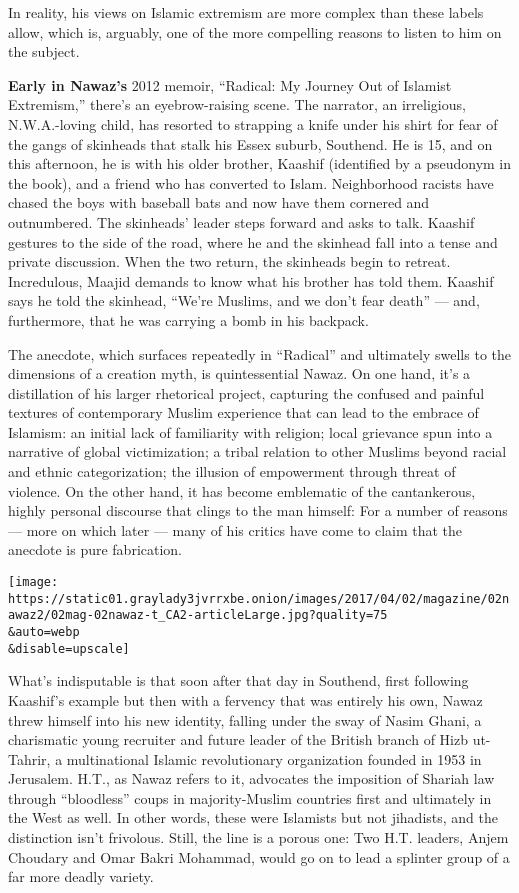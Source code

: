 In reality, his views on Islamic extremism are more complex than these
labels allow, which is, arguably, one of the more compelling reasons to
listen to him on the subject.

\textbf{Early in Nawaz's} 2012 memoir, ``Radical: My Journey Out of
Islamist Extremism,'' there's an eyebrow-raising scene. The narrator, an
irreligious, N.W.A.-loving child, has resorted to strapping a knife
under his shirt for fear of the gangs of skinheads that stalk his Essex
suburb, Southend. He is 15, and on this afternoon, he is with his older
brother, Kaashif (identified by a pseudonym in the book), and a friend
who has converted to Islam. Neighborhood racists have chased the boys
with baseball bats and now have them cornered and outnumbered. The
skinheads' leader steps forward and asks to talk. Kaashif gestures to
the side of the road, where he and the skinhead fall into a tense and
private discussion. When the two return, the skinheads begin to retreat.
Incredulous, Maajid demands to know what his brother has told them.
Kaashif says he told the skinhead, ``We're Muslims, and we don't fear
death'' --- and, furthermore, that he was carrying a bomb in his
backpack.

The anecdote, which surfaces repeatedly in ``Radical'' and ultimately
swells to the dimensions of a creation myth, is quintessential Nawaz. On
one hand, it's a distillation of his larger rhetorical project,
capturing the confused and painful textures of contemporary Muslim
experience that can lead to the embrace of Islamism: an initial lack of
familiarity with religion; local grievance spun into a narrative of
global victimization; a tribal relation to other Muslims beyond racial
and ethnic categorization; the illusion of empowerment through threat of
violence. On the other hand, it has become emblematic of the
cantankerous, highly personal discourse that clings to the man himself:
For a number of reasons --- more on which later --- many of his critics
have come to claim that the anecdote is pure fabrication.

\texttt{[image: https://static01.graylady3jvrrxbe.onion/images/2017/04/02/magazine/02nawaz2/02mag-02nawaz-t\_CA2-articleLarge.jpg?quality=75\\\&auto=webp\\\&disable=upscale]}

What's indisputable is that soon after that day in Southend, first
following Kaashif's example but then with a fervency that was entirely
his own, Nawaz threw himself into his new identity, falling under the
sway of Nasim Ghani, a charismatic young recruiter and future leader of
the British branch of Hizb ut-Tahrir, a multinational Islamic
revolutionary organization founded in 1953 in Jerusalem. H.T., as Nawaz
refers to it, advocates the imposition of Shariah law through
``bloodless'' coups in majority-Muslim countries first and ultimately in
the West as well. In other words, these were Islamists but not
jihadists, and the distinction isn't frivolous. Still, the line is a
porous one: Two H.T. leaders, Anjem Choudary and Omar Bakri Mohammad,
would go on to lead a splinter group of a far more deadly variety.

